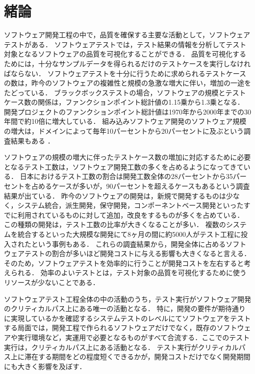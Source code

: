 \chapter{緒論}
ソフトウェア開発工程の中で，品質を確保する主要な活動として，ソフトウェアテストがある．
ソフトウェアテストでは，テスト結果の情報を分析してテスト対象となるソフトウェアの品質を可視化することができる．
品質を可視化するためには，十分なサンプルデータを得られるだけのテストケースを実行しなければならない．
ソフトウェアテストを十分に行うために求められるテストケースの数は，昨今のソフトウェアの複雑性と規模の急激な増大に伴い，増加の一途をたどっている．
ブラックボックステストの場合，ソフトウェアの規模とテストケース数の関係は，ファンクションポイント総計値の1.15乗から1.3乗となる\cite{jones1998estimating}．
開発プロジェクトのファンクションポイント総計値は1970年から2000年までの30年間で約10倍に増大している\cite{longstreet2000}．
組み込みソフトウェア開発のソフトウェア規模の増大は，ドメインによって毎年10パーセントから20パーセントに及ぶという調査結果もある \cite{jones2009}．

ソフトウェアの規模の増大に伴ったテストケース数の増加に対応するために必要となるテスト工数は，ソフトウェア開発工数の多くを占めるようになってきている．
日本におけるテスト工数の割合は開発工数全体の28パーセントから35パーセントを占めるケースが多いが，90パーセントを超えるケースもあるという調査結果が出ている\cite{IPA2015}．
昨今のソフトウェアの開発は，新規で開発するものは少なく，システム統合，派生開発\cite{simizu2005}\cite{simizu2009}，保守開発，コンポーネントベース開発\cite{gao2003testing}といったすでに利用されているものに対して追加，改良をするものが多くを占めている．
この種類の開発は，テスト工数の比率が大きくなることが多い．
複数のシステムを統合するといった大規模な開発にて8ヶ月の間に約5000人がテスト工程に投入されたという事例もある\cite{MTBUDay2}．
これらの調査結果から，開発全体に占めるソフトウェアテストの割合が多いほど開発コストに与える影響も大きくなると言える．
そのため，ソフトウェアテストを効率的に行うことが開発コストを左右すると考えられる．
効率のよいテストとは，テスト対象の品質を可視化するために使うリソースが少ないことである．

ソフトウェアテスト工程全体の中の活動のうち，テスト実行がソフトウェア開発のクリティカルパス上にある唯一の活動となる．
特に，開発の要件が期待通りに実現しているかを確認するシステムテストのレベルにてソフトウェアをテストする局面では，開発工程で作られるソフトウェアだけでなく，既存のソフトウェアや実行環境など，実運用で必要となるものがすべて合流する．ここでのテスト実行は，クリティカルパス上にある活動となる．
テスト実行がクリティカルパス上に滞在する期間をどの程度短くできるかが，開発コストだけでなく開発期間にも大きく影響を及ぼす．

